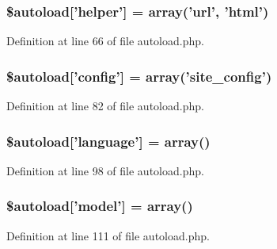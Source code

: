 \subsubsection[{\$autoload}]{\setlength{\rightskip}{0pt plus 5cm}\$autoload['helper'] = array('url', 'html')}\label{autoload_8php_aa98014ce8ad854ad9500e65ff159272d}


Definition at line 66 of file autoload.\-php.

\subsubsection[{\$autoload}]{\setlength{\rightskip}{0pt plus 5cm}\$autoload['config'] = array('site\-\_\-config')}\label{autoload_8php_ac051887e192979c0320e05821bad8f33}


Definition at line 82 of file autoload.\-php.

\subsubsection[{\$autoload}]{\setlength{\rightskip}{0pt plus 5cm}\$autoload['language'] = array()}\label{autoload_8php_addfee4f4b38a8235172cb173995a9c0b}


Definition at line 98 of file autoload.\-php.

\subsubsection[{\$autoload}]{\setlength{\rightskip}{0pt plus 5cm}\$autoload['model'] = array()}\label{autoload_8php_a942b884082b1defda7fb10ee71bba324}


Definition at line 111 of file autoload.\-php.

